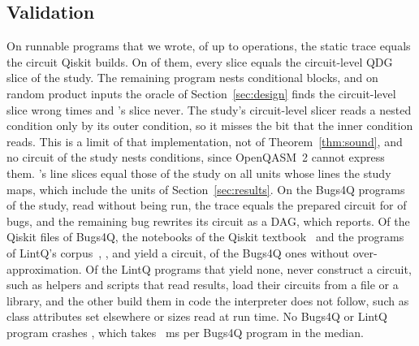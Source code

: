 \subsection{Validation}
On \numToolDevPrograms{} runnable programs that we wrote, of up to \numToolDevMaxOps{} operations, the static
trace equals the circuit Qiskit builds. On \numToolDevSliceEqual{} of them, every slice equals the
circuit-level QDG slice of the study. The remaining program nests conditional blocks, and on
\numToolNestedDraws{} random product inputs the oracle of Section~\ref{sec:design} finds the circuit-level slice
wrong \numToolNestedStudyWrong{} times and \tool{}'s slice never. The study's circuit-level slicer reads a
nested condition only by its outer condition, so it misses the bit that the inner condition reads. This is a
limit of that implementation, not of Theorem~\ref{thm:sound}, and no circuit of the study nests conditions,
since OpenQASM~2 cannot express them. \tool{}'s line slices equal those of the
study on all \numToolTTwoUnits{} units whose lines the study maps, which include the \numLinesUnits{} units of
Section~\ref{sec:results}. On the Bugs4Q programs of the study, read without being run, the trace equals the
prepared circuit for \numToolTOneExact{} of \numToolTOneBugs{} bugs, and the remaining bug rewrites its
circuit as a DAG, which \tool{} reports. Of the \numToolBugsQiskit{} Qiskit files of Bugs4Q, the
\numToolTextbookQiskit{} notebooks of the Qiskit textbook~\cite{qiskittextbook} and the \numScaleSOneFiles{}
programs of LintQ's corpus~\cite{paltenghi2024lintq}, \numToolBugsCircuit{}, \numToolTextbookCircuit{} and
\numScaleSOneSliced{} yield a circuit, \numToolBugsResolved{} of the Bugs4Q ones without over-approximation. Of the
\numCovNoCircuit{} LintQ programs that yield none, \numCovNoConstruction{} never construct a circuit, such as
helpers and scripts that read results, \numCovFromFile{} load their circuits from a file or a library, and the
other \numCovOther{} build them in code the interpreter does not follow, such as class attributes set
elsewhere or sizes read at run time.
No Bugs4Q or LintQ program crashes \tool{}, which takes \numToolBugsMedianMs{}~ms per Bugs4Q program in the
median.


